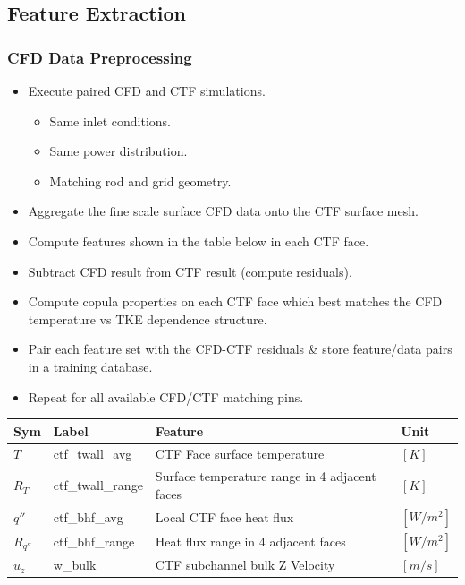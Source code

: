 \documentclass[t, pdftex]{beamer}
\begin{document}
\subsection*{Feature Extraction}
\begin{frame}
\frametitle{CFD Data Preprocessing}
\vspace{-20pt}
\scriptsize{
\begin{itemize}
    \item Execute paired CFD and CTF simulations.
    \begin{itemize}
        \item Same inlet conditions.
        \item Same power distribution.
        \item Matching rod and grid geometry.
    \end{itemize}
    \item Aggregate the fine scale surface CFD data onto the CTF surface mesh.
    \item Compute features shown in the table below in each CTF face.
    \item Subtract CFD result from CTF result (compute residuals).
    \item Compute copula properties on each CTF face which best matches the CFD temperature vs TKE dependence structure.
    \item Pair each feature set with the CFD-CTF residuals \& store feature/data pairs in a training database.
    \item Repeat for all available CFD/CTF matching pins.
\end{itemize}
}
\vspace{-8pt}
\begin{table}[h]
    \begin{center}
        \tiny
        \begin{tabular}[h]{|l | l | l | l |}
            \hline
            Sym & Label & Feature & Unit \\
            \hline
            \hline
            $T$ & ctf\_twall\_avg & CTF Face surface temperature & $[K]$ \\
            $R_T$ & ctf\_twall\_range & Surface temperature range in 4 adjacent faces & $[K]$ \\
            $q''$ & ctf\_bhf\_avg & Local CTF face heat flux & $[W/m^2]$ \\
            $R_{q''}$ & ctf\_bhf\_range & Heat flux range in 4 adjacent faces & $[W/m^2]$ \\
            $u_z$ & w\_bulk & CTF subchannel bulk Z Velocity &  $[m/s]$ \\

\end{tabular}
\end{center}
\end{table}
\end{frame}
\end{document}
